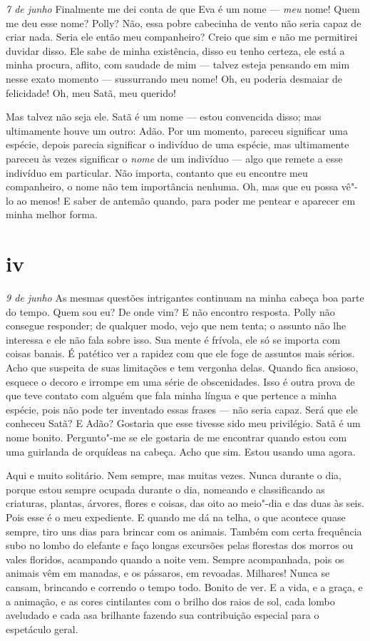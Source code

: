 \textit{7 de junho} Finalmente me dei conta de que Eva é um nome --- \textit{meu}
nome! Quem me deu esse nome? Polly? Não, essa pobre cabecinha de vento não seria
capaz de criar nada. Seria ele então meu companheiro? Creio que sim e não me
permitirei duvidar disso. Ele sabe de minha existência, disso eu tenho certeza,
ele está a minha procura, aflito, com saudade de mim --- talvez esteja pensando
em mim nesse exato momento --- sussurrando meu nome! Oh, eu poderia desmaiar de
felicidade! Oh, meu Satã, meu querido!

Mas talvez não seja ele. Satã é um nome --- estou convencida disso; mas
ultimamente houve um outro: Adão. Por um momento, pareceu significar uma
espécie, depois parecia significar o indivíduo de uma espécie, mas ultimamente
pareceu às vezes significar o \textit{nome} de um indivíduo --- algo que remete
a esse indivíduo em particular. Não importa, contanto que eu encontre meu
companheiro, o nome não tem importância nenhuma. Oh, mas que eu possa vê"-lo ao
menos! E saber de antemão quando, para poder me pentear e aparecer em minha
melhor forma.

\section*{iv}


\textit{9 de junho} As mesmas questões intrigantes continuam na minha cabeça boa
parte do tempo. Quem sou eu? De onde vim? E não encontro resposta. Polly não
consegue responder; de qualquer modo, vejo que nem tenta; o assunto não
lhe interessa e ele não fala sobre isso. Sua mente é frívola, ele só se importa com
coisas banais. É patético ver a rapidez com que ele foge de assuntos mais
sérios. Acho que suspeita de suas limitações e tem vergonha delas. Quando
fica ansioso, esquece o decoro e irrompe em uma série de obscenidades. Isso é
outra prova de que teve contato com alguém que fala minha língua e que pertence a
minha espécie, pois não pode ter inventado essas frases --- não seria capaz.
Será que ele conheceu Satã? E Adão? Gostaria que esse tivesse sido
meu privilégio. Satã é um nome bonito. Pergunto"-me se ele gostaria de me
encontrar quando estou com uma guirlanda de orquídeas na cabeça. Acho que sim.
Estou usando uma agora.

Aqui e muito solitário. Nem sempre, mas muitas vezes. Nunca durante o dia, porque estou
sempre ocupada durante o dia, nomeando e classificando as criaturas, plantas,
árvores, flores e coisas, das oito ao meio"-dia e das duas às seis. Pois esse é o
meu expediente. E quando me dá na telha, o que acontece quase sempre, tiro uns
dias para brincar com os animais. Também com certa frequência subo no lombo do
elefante e faço longas excursões pelas florestas dos morros ou vales floridos,
acampando quando a noite vem. Sempre acompanhada, pois os animais vêm em
manadas, e os pássaros, em revoadas. Milhares! Nunca se cansam, brincando e
correndo o tempo todo. Bonito de ver. E a vida, e a graça, e a animação, e as
cores cintilantes com o brilho dos raios de sol, cada lombo aveludado e cada asa
brilhante fazendo sua contribuição especial para o espetáculo geral.

